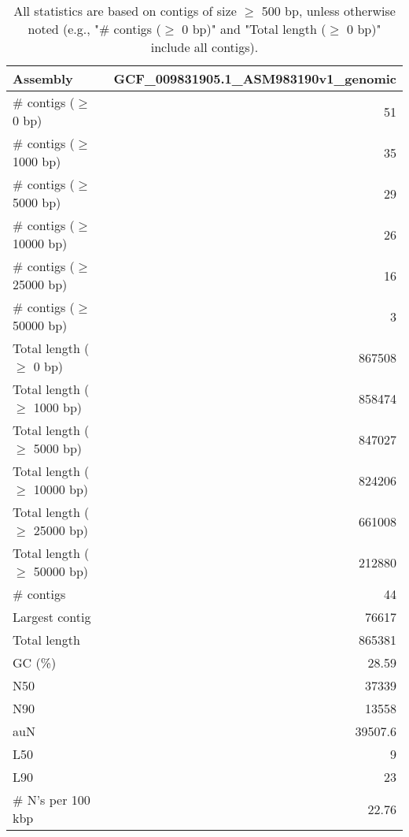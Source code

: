 \documentclass[12pt,a4paper]{article}
\begin{document}
\begin{table}[ht]
\begin{center}
\caption{All statistics are based on contigs of size $\geq$ 500 bp, unless otherwise noted (e.g., "\# contigs ($\geq$ 0 bp)" and "Total length ($\geq$ 0 bp)" include all contigs).}
\begin{tabular}{|l*{1}{|r}|}
\hline
Assembly & GCF\_009831905.1\_ASM983190v1\_genomic \\ \hline
\# contigs ($\geq$ 0 bp) & 51 \\ \hline
\# contigs ($\geq$ 1000 bp) & 35 \\ \hline
\# contigs ($\geq$ 5000 bp) & 29 \\ \hline
\# contigs ($\geq$ 10000 bp) & 26 \\ \hline
\# contigs ($\geq$ 25000 bp) & 16 \\ \hline
\# contigs ($\geq$ 50000 bp) & 3 \\ \hline
Total length ($\geq$ 0 bp) & 867508 \\ \hline
Total length ($\geq$ 1000 bp) & 858474 \\ \hline
Total length ($\geq$ 5000 bp) & 847027 \\ \hline
Total length ($\geq$ 10000 bp) & 824206 \\ \hline
Total length ($\geq$ 25000 bp) & 661008 \\ \hline
Total length ($\geq$ 50000 bp) & 212880 \\ \hline
\# contigs & 44 \\ \hline
Largest contig & 76617 \\ \hline
Total length & 865381 \\ \hline
GC (\%) & 28.59 \\ \hline
N50 & 37339 \\ \hline
N90 & 13558 \\ \hline
auN & 39507.6 \\ \hline
L50 & 9 \\ \hline
L90 & 23 \\ \hline
\# N's per 100 kbp & 22.76 \\ \hline
\end{tabular}
\end{center}
\end{table}
\end{document}
